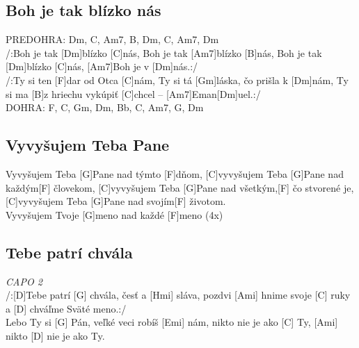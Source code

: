 \documentclass[10pt]{article}
\begin{document}
\begin{Large}
\begin{minipage}{\textwidth}
\subsection{Boh je tak blízko nás}
\begin{multicols}{2}
\begin{guitar}
	PREDOHRA: 
	Dm, C, Am7, B, 
	Dm, C, Am7, Dm
	\\
	/:Boh je tak [Dm]blízko [C]nás, 
	Boh je tak [Am7]blízko [B]nás, 
	Boh je tak [Dm]blízko [C]nás, 
	[Am7]Boh je v [Dm]nás.:/ 
	\\
	/:Ty si ten [F]dar od Otca [C]nám, 
	Ty si tá [Gm]láska, čo prišla k [Dm]nám, 
	Ty si ma [B]z hriechu vykúpiť [C]chcel
	– [Am7]Eman[Dm]uel.:/
	\\
	DOHRA: 
	F, C, Gm, Dm, Bb, 
	C, Am7, G, Dm
\end{guitar}
\end{multicols}
\end{minipage}

\begin{minipage}{\textwidth}
\begin{multicols}{2}
\subsection{Vyvyšujem Teba Pane}
\begin{guitar}	
	[C]Vyvyšujem Teba [G]Pane 
	nad týmto [F]dňom,
	[C]vyvyšujem Teba [G]Pane 
	nad každým[F] človekom, 
	[C]vyvyšujem Teba [G]Pane 
	nad všetkým,[F] čo stvorené je,
	[C]vyvyšujem Teba [G]Pane
 nad svojím[F] životom.
	\\
	[C]Vyvyšujem Tvoje [G]meno 
	nad každé [F]meno (4x) 
\end{guitar}

\subsection{Tebe patrí chvála}
\begin{guitar}	
	\textit{CAPO 2}\\
	/:[D]Tebe patrí [G] chvála, 
	česť a [Hmi] sláva,
	pozdvi [Ami] hnime svoje [C] ruky 
	a [D] chváľme Sväté meno.:/
	\\
	Lebo Ty si [G] Pán, 
	veľké veci robíš [Emi] nám, 
	nikto nie je ako [C] Ty, 
	[Ami] nikto [D] nie je ako Ty.	 
\end{guitar}
\end{multicols}
\end{minipage}

\begin{minipage}{\textwidth}

\end{minipage}
\end{Large}
\end{document}

